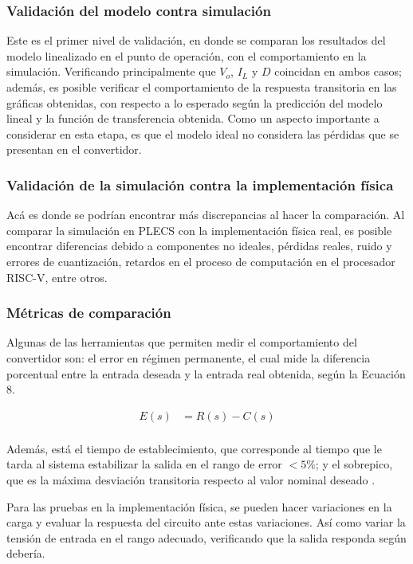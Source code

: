 \documentclass[conference]{IEEEtran}
\begin{document}
\subsubsection{Validación del modelo contra simulación}
Este es el primer nivel de validación, en donde se comparan los resultados del modelo linealizado en el punto de operación, 
con el comportamiento en la simulación. Verificando principalmente que $V_{o}$, $I_L$ y $D$ coincidan en ambos casos; además, es posible
verificar el comportamiento de la respuesta transitoria en las gráficas obtenidas, con respecto a lo esperado según la predicción del modelo
lineal y la función de transferencia obtenida.
Como un aspecto importante a considerar en esta etapa, es que el modelo ideal no considera las pérdidas que se presentan en el convertidor.

\subsubsection{Validación de la simulación contra la implementación física}
Acá es donde se podrían encontrar más discrepancias al hacer la comparación. Al comparar la simulación en PLECS con la implementación
física real, es posible encontrar diferencias debido a componentes no ideales, pérdidas reales, ruido y errores de cuantización,
retardos en el proceso de computación en el procesador RISC-V, entre otros. 

\subsubsection{Métricas de comparación}
Algunas de las herramientas que permiten medir el comportamiento del convertidor son: el error en régimen permanente, el cual mide la diferencia
porcentual entre la entrada deseada y la entrada real obtenida, según la Ecuación 8.


\begin{equation}
\begin{aligned}
    E(s) &= R(s) - C(s)  \\
\end{aligned}
\label{steady_State_error}
\end{equation}


Además, está el tiempo de establecimiento, que corresponde al tiempo que le tarda al sistema estabilizar 
la salida en el rango de error $< 5\%$; y el sobrepico, que es la máxima desviación transitoria respecto al valor nominal deseado \cite{nise2015control}.

Para las pruebas en la implementación física, se pueden hacer variaciones en la carga y evaluar la respuesta del circuito ante estas variaciones. Así como
variar la tensión de entrada en el rango adecuado, verificando que la salida responda según debería.
\end{document}
